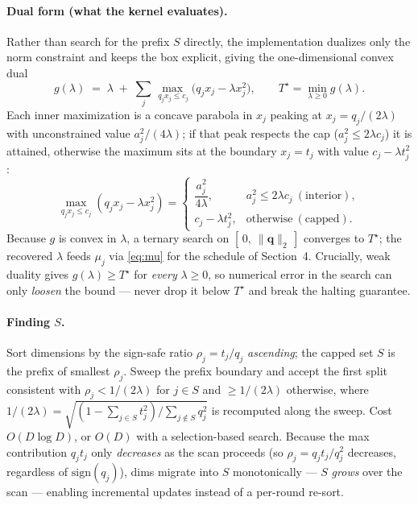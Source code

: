 \documentclass[11pt,a4paper]{article}
\newcommand{\qv}{\mathbf{q}}
\newcommand{\norm}[1]{\lVert #1 \rVert}
\begin{document}
\paragraph{Dual form (what the kernel evaluates).} Rather than search for the
prefix $S$ directly, the implementation dualizes only the norm constraint and
keeps the box explicit, giving the one-dimensional convex dual
\begin{equation}
  g(\lambda) \;=\; \lambda
    \;+\; \sum_j \max_{\,q_j x_j \le c_j}\big(q_j x_j - \lambda x_j^2\big),
  \qquad
  T^\star = \min_{\lambda\ge0} g(\lambda).
  \label{eq:dual}
\end{equation}
Each inner maximization is a concave parabola in $x_j$ peaking at
$x_j=q_j/(2\lambda)$ with unconstrained value $a_j^2/(4\lambda)$; if that peak
respects the cap ($a_j^2\le2\lambda c_j$) it is attained, otherwise the maximum
sits at the boundary $x_j=t_j$ with value $c_j-\lambda t_j^2$:
\begin{equation}
  \max_{q_j x_j\le c_j}(q_j x_j-\lambda x_j^2)
   =\begin{cases}
      \dfrac{a_j^2}{4\lambda}, & a_j^2\le 2\lambda c_j\ (\text{interior}),\\[8pt]
      c_j-\lambda t_j^2,       & \text{otherwise}\ (\text{capped}).
    \end{cases}
  \label{eq:dualdim}
\end{equation}
Because $g$ is convex in $\lambda$, a ternary search on $[\,0,\ \norm{\qv}_2\,]$
converges to $T^\star$; the recovered $\lambda$ feeds $\mu_j$ via \eqref{eq:mu}
for the schedule of Section~4. Crucially, weak duality gives $g(\lambda)\ge
T^\star$ for \emph{every} $\lambda\ge0$, so numerical error in the search can only
\emph{loosen} the bound --- never drop it below $T^\star$ and break the halting
guarantee.

\paragraph{Finding $S$.} Sort dimensions by the sign-safe ratio
$\rho_j=t_j/q_j$ \emph{ascending}; the capped set $S$ is the prefix of smallest
$\rho_j$. Sweep the prefix boundary and accept the first split consistent with
$\rho_j<1/(2\lambda)$ for $j\in S$ and $\ge1/(2\lambda)$ otherwise, where
$1/(2\lambda)=\sqrt{(1-\sum_{j\in S}t_j^2)/\sum_{j\notin S}q_j^2}$ is recomputed
along the sweep. Cost $O(D\log D)$, or $O(D)$ with a selection-based search.
Because the max contribution $q_j t_j$ only \emph{decreases} as the scan proceeds
(so $\rho_j=q_j t_j/q_j^2$ decreases, regardless of $\mathrm{sign}(q_j)$), dims
migrate into $S$ monotonically --- $S$ \emph{grows} over the scan --- enabling
incremental updates instead of a per-round re-sort.
\end{document}
